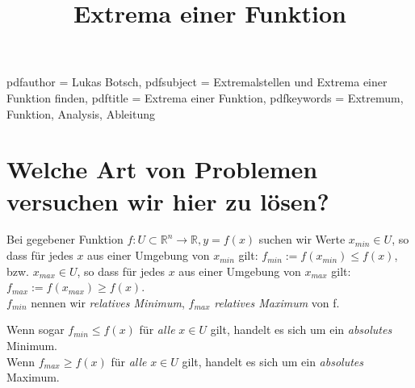 


\title{Extrema einer Funktion}
\hypersetup
{
    pdfauthor = {Lukas Botsch},
    pdfsubject = {Extremalstellen und Extrema einer Funktion finden},
    pdftitle = {Extrema einer Funktion},
    pdfkeywords = {Extremum, Funktion, Analysis, Ableitung}
}


\maketitle{}

%
% 
%
%
%
%
%
%


\section{Welche Art von Problemen versuchen wir hier zu lösen?}

Bei gegebener Funktion $f: U \subset \mathbb{R}^n \rightarrow \mathbb{R}, y = f(x)$ suchen wir Werte $x_{min} \in U$,
so dass für jedes $x$ aus einer Umgebung von $x_{min}$ gilt: $f_{min} := f(x_{min}) \leq f(x)$, bzw. $x_{max} \in U$,
so dass für jedes $x$ aus einer Umgebung von $x_{max}$ gilt: $f_{max} := f(x_{max}) \geq f(x)$. \\
$f_{min}$ nennen wir \textit{relatives Minimum}, $f_{max}$ \textit{relatives Maximum} von f.

Wenn sogar $f_{min} \leq f(x)$ für {\it alle} $x\in U$ gilt, handelt es sich um ein \textit{absolutes} Minimum.\\
Wenn $f_{max} \geq f(x)$ für {\it alle} $x\in U$ gilt, handelt es sich um ein \textit{absolutes} Maximum.

